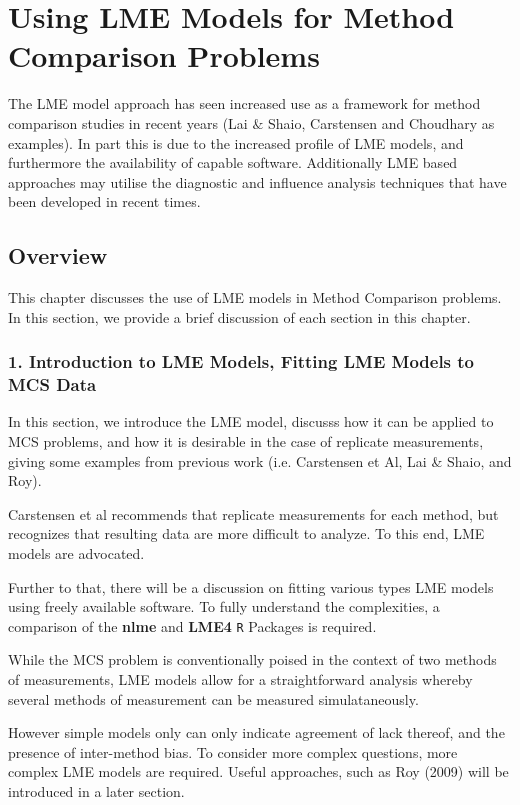 \documentclass[Main.tex]{subfiles}
\begin{document}
\setcounter{tocdepth}{1}
\tableofcontents
\chapter{Using LME Models for Method Comparison Problems}
The LME model approach has seen increased use as a framework for method comparison studies in recent years (Lai $\&$ Shaio, Carstensen and Choudhary as examples). In part this is due to the increased profile of LME models, and furthermore the availability of capable software. Additionally LME based approaches may utilise the diagnostic and influence analysis techniques that have been developed in recent times.

\section{Overview}
This chapter discusses the use of LME models in Method Comparison problems. 
In this section, we provide a brief discussion of each section in this chapter.


\subsection*{1. Introduction to LME Models, Fitting LME Models to MCS Data}

In this section, we introduce the LME model, discusss how it can be applied to MCS problems, and how it is desirable in the case of replicate measurements, giving some examples from previous work (i.e. Carstensen et Al, Lai \& Shaio, and Roy).

Carstensen et al recommends that replicate measurements for each method, but recognizes that resulting data are more difficult to analyze. To this end, LME models are advocated.

Further to that, there will be a discussion on fitting various types LME models using freely available software. To fully understand the complexities, a comparison of the \textbf{nlme} and \textbf{LME4} \texttt{R} Packages is required.

While the MCS problem is conventionally poised in the context of two methods of measurements, LME models allow for a straightforward analysis whereby several methods of measurement can be measured simulataneously. 


However simple models only can only indicate agreement of lack thereof, and the presence of inter-method bias. To consider more complex questions, more complex LME models are required.  Useful approaches, such as Roy (2009) will be introduced in a later section.
\end{document}
